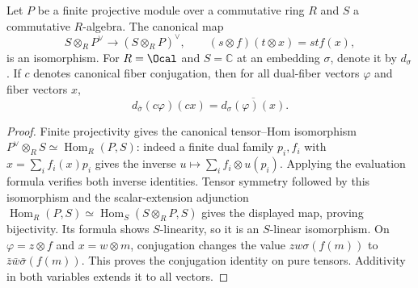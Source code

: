 \begin{lemma}
\label{lem:dual-fiber-base-change}
\leanok
Let $P$ be a finite projective module over a commutative ring $R$ and
$S$ a commutative $R$-algebra. The canonical map
\[
 S\otimes_R P^\vee\longrightarrow(S\otimes_R P)^\vee,
 \qquad (s\otimes f)(t\otimes x)=st f(x),
\]
is an isomorphism. For $R=\Ocal$ and $S=\mathbb C$ at an embedding
$\sigma$, denote it by $d_\sigma$. If $c$ denotes canonical fiber
conjugation, then for all dual-fiber vectors $\varphi$ and fiber vectors $x$,
\[
 d_{\bar\sigma}(c\varphi)(cx)
   =\overline{d_\sigma(\varphi)(x)}.
\]
\end{lemma}
\begin{proof}
Finite projectivity gives the canonical tensor--Hom isomorphism
$P^\vee\otimes_R S\simeq\operatorname{Hom}_R(P,S)$: indeed a
finite dual family $p_i,f_i$ with $x=\sum_i f_i(x)p_i$ gives the
inverse $u\mapsto\sum_i f_i\otimes u(p_i)$. Applying the evaluation
formula verifies both inverse identities. Tensor symmetry followed by
this isomorphism and the scalar-extension adjunction
$\operatorname{Hom}_R(P,S)\simeq
\operatorname{Hom}_S(S\otimes_R P,S)$ gives the displayed map, proving
bijectivity. Its formula shows $S$-linearity, so it is an $S$-linear
isomorphism. On $\varphi=z\otimes f$ and $x=w\otimes m$, conjugation
changes the value $zw\sigma(f(m))$ to
$\bar z\bar w\bar\sigma(f(m))$. This proves the conjugation identity
on pure tensors. Additivity in both variables extends it to all vectors.
\end{proof}

